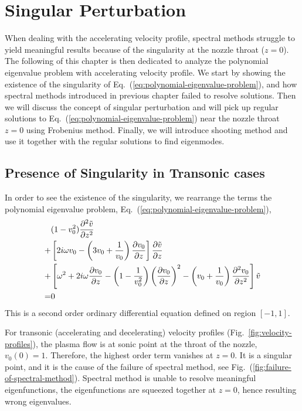 \chapter{Singular Perturbation} \label{chap:singular-perturbation}
When dealing with the accelerating velocity profile, spectral methods struggle to yield meaningful results because of the singularity at the nozzle throat ($z=0$). The following of this chapter is then dedicated to analyze the polynomial eigenvalue problem with accelerating velocity profile. We start by showing the existence of the singularity of Eq.~(\ref{eq:polynomial-eigenvalue-problem}), and how spectral methods introduced in previous chapter failed to resolve solutions. Then we will discuss the concept of singular perturbation and will pick up regular solutions to Eq.~(\ref{eq:polynomial-eigenvalue-problem}) near the nozzle throat $z=0$ using Frobenius method. Finally, we will introduce shooting method and use it together with the regular solutions to find eigenmodes.

\section{Presence of Singularity in Transonic cases} \label{sec:presence-of-singularity}
In order to see the existence of the singularity, we rearrange the terms the polynomial eigenvalue problem, Eq.~(\ref{eq:polynomial-eigenvalue-problem}),
\begin{equation} \label{eq:singular-perturbation-problem}
	\begin{aligned}
		  & (1-v_0^2)\pdv[2]{\tilde{v}}{z}                                                                                                                                        \\
		+ & \left[2i\omega v_0 - \left(3v_0 + \frac{1}{v_0}\right)\pdv{v_0}{z}\right]\pdv{\tilde{v}}{z}                                                                           \\
		+ & \left[\omega^2 + 2i\omega\pdv{v_0}{z} -\left(1 - \frac{1}{v_0^2}\right)\left(\pdv{v_0}{z}\right)^2 - \left(v_0 + \frac{1}{v_0}\right)\pdv[2]{v_0}{z} \right]\tilde{v} \\
		= & 0
	\end{aligned}
\end{equation}
This is a second order ordinary differential equation defined on region $[-1,1]$.

For transonic (accelerating and decelerating) velocity profiles (Fig.~\ref{fig:velocity-profiles}), the plasma flow is at sonic point at the throat of the nozzle, $v_0(0)=1$. Therefore, the highest order term vanishes at $z=0$. It is a singular point, and it is the  cause of the failure of spectral method, see Fig.~(\ref{fig:failure-of-spectral-method}). Spectral method is unable to resolve meaningful eigenfunctions, the eigenfunctions are squeezed together at $z=0$, hence resulting wrong eigenvalues.

